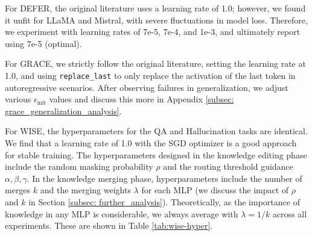 \begin{table}
  \centering
  \vspace{-0.4cm}
  \caption{WISE hyper-parameters during editing and merging.}
  \vspace{5pt}
  \label{tab:wise-hyper}%
\end{table}
For DEFER, the original literature uses a learning rate of 1.0; however, we found it unfit for LLaMA and Mistral, with severe fluctuations in model loss.
Therefore, we experiment with learning rates of 7e-5, 7e-4, and 1e-3, and ultimately report using 7e-5 (optimal).

For GRACE, we strictly follow the original literature, setting the learning rate at 1.0, and using \texttt{replace\_last} to only replace the activation of the last token in autoregressive scenarios.
After observing failures in generalization, we adjust various $ \epsilon_{\text{init}} $ values and discuss this more in Appendix \ref{subsec: grace_generalization_analysis}.

For WISE, the hyperparameters for the QA and Hallucination tasks are identical.
We find that a learning rate of 1.0 with the SGD \cite{sgd} optimizer is a good approach for stable training.
The hyperparameters designed in the knowledge editing phase include the random masking probability $ \rho $ and the routing threshold guidance $ \alpha, \beta, \gamma $.
In the knowledge merging phase, hyperparameters include the number of merges $ k $ and the merging weights $ \lambda $ for each MLP (we discuss the impact of $ \rho $ and $ k $ in Section \ref{subsec: further_analysis}).
Theoretically, as the importance of knowledge in any MLP is considerable, we always average with $ \lambda = 1 / k $ across all experiments. These are shown in Table \ref{tab:wise-hyper}.

